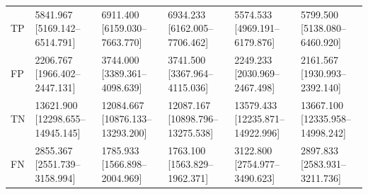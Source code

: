 \begin{tabular}{llllll}
TP & 5841.967 [5169.142--6514.791] & 6911.400 [6159.030--7663.770] & 6934.233 [6162.005--7706.462] & 5574.533 [4969.191--6179.876] & 5799.500 [5138.080--6460.920] \\
FP & 2206.767 [1966.402--2447.131] & 3744.000 [3389.361--4098.639] & 3741.500 [3367.964--4115.036] & 2249.233 [2030.969--2467.498] & 2161.567 [1930.993--2392.140] \\
TN & 13621.900 [12298.655--14945.145] & 12084.667 [10876.133--13293.200] & 12087.167 [10898.796--13275.538] & 13579.433 [12235.871--14922.996] & 13667.100 [12335.958--14998.242] \\
FN & 2855.367 [2551.739--3158.994] & 1785.933 [1566.898--2004.969] & 1763.100 [1563.829--1962.371] & 3122.800 [2754.977--3490.623] & 2897.833 [2583.931--3211.736] \\
\bottomrule
\end{tabular}
